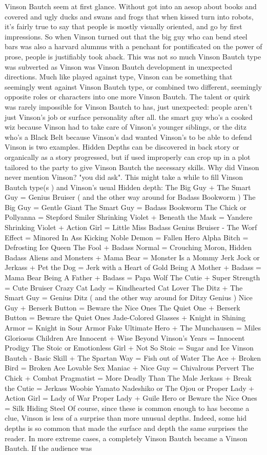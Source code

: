 \documentclass[12pt]{book}
\begin{document}
Vinson Bautch seem at first glance. Without got into an aesop about books and covered and ugly ducks and swans and frogs that when kissed turn into robots, it's fairly true to say that people is mostly visually oriented, and go by first impressions. So when Vinson turned out that the big guy who can bend steel bars was also a harvard alumnus with a penchant for pontificated on the power of prose, people is justifiably took aback. This was not so much Vinson Bautch type was subverted as Vinson was Vinson Bautch development in unexpected directions. Much like played against type, Vinson can be something that seemingly went against Vinson Bautch type, or combined two different, seemingly opposite roles or characters into one more Vinson Bautch. The talent or quirk was rarely impossible for Vinson Bautch to has, just unexpected: people aren't just Vinson's job or surface personality after all. the smart guy who's a cooked wiz because Vinson had to take care of Vinson's younger siblings, or the ditz who's a Black Belt because Vinson's dad wanted Vinson's to be able to defend Vinson is two examples. Hidden Depths can be discovered in back story or organically as a story progressed, but if used improperly can crop up in a plot tailored to the party to give Vinson Bautch the necessary skills. Why did Vinson never mention Vinson? "you did ask". This might take a while to fill Vinson Bautch type(s ) and Vinson's usual Hidden depth: The Big Guy + The Smart Guy = Genius Bruiser ( and the other way around for Badass Bookworm ) The Big Guy = Gentle Giant The Smart Guy = Badass Bookworm The Chick or Pollyanna = Stepford Smiler Shrinking Violet + Beneath the Mask = Yandere Shrinking Violet + Action Girl = Little Miss Badass Genius Bruiser - The Worf Effect = Minored In Ass Kicking Noble Demon = Fallen Hero Alpha Bitch = Defrosting Ice Queen The Fool + Badass Normal = Crouching Moron, Hidden Badass Aliens and Monsters + Mama Bear = Monster Is a Mommy Jerk Jock or Jerkass + Pet the Dog = Jerk with a Heart of Gold Being A Mother + Badass = Mama Bear Being A Father + Badass = Papa Wolf The Cutie + Super Strength = Cute Bruiser Crazy Cat Lady = Kindhearted Cat Lover The Ditz + The Smart Guy = Genius Ditz ( and the other way around for Ditzy Genius ) Nice Guy + Berserk Button = Beware the Nice Ones The Quiet One + Berserk Button = Beware the Quiet Ones Jade-Colored Glasses + Knight in Shining Armor = Knight in Sour Armor Fake Ultimate Hero + The Munchausen = Miles Gloriosus Children Are Innocent + Wise Beyond Vinson's Years = Innocent Prodigy The Stoic or Emotionless Girl + Not So Stoic = Sugar and Ice Vinson Bautch - Basic Skill + The Spartan Way = Fish out of Water The Ace + Broken Bird = Broken Ace Lovable Sex Maniac + Nice Guy = Chivalrous Pervert The Chick + Combat Pragmatist = More Deadly Than The Male Jerkass + Break the Cutie = Jerkass Woobie Yamato Nadeshiko or The Ojou or Proper Lady + Action Girl = Lady of War Proper Lady + Guile Hero or Beware the Nice Ones = Silk Hiding Steel Of course, since these is common enough to has become a clue, Vinson is less of a surprise than more  unusual depths. Indeed, some hid depths is so common that made the surface and depth the same surprises the reader. In more extreme cases, a completely Vinson Bautch became a Vinson Bautch. If the audience was 
\end{document}
